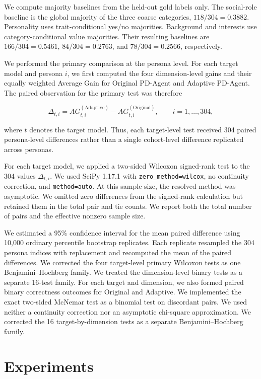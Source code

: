 \documentclass{ieeeaccess}
\begin{document}
We compute majority baselines from the held-out gold labels only. The social-role baseline
is the global majority of the three coarse categories, $118/304=0.3882$. Personality uses
trait-conditional yes/no majorities. Background and interests use category-conditional
value majorities. Their resulting baselines are $166/304=0.5461$, $84/304=0.2763$, and
$78/304=0.2566$, respectively.

We performed the primary comparison at the persona level. For each target model and persona $i$, we first computed the four dimension-level gains and their equally weighted Average Gain for Original PD-Agent and Adaptive PD-Agent. The paired observation for the primary test was therefore

\begin{equation}
\Delta_{t,i}
=
AG_{t,i}^{(\mathrm{Adaptive})}
-
AG_{t,i}^{(\mathrm{Original})},
\qquad i=1,\ldots,304,
\end{equation}

where $t$ denotes the target model. Thus, each target-level test received 304 paired persona-level differences rather than a single cohort-level difference replicated across personas.

For each target model, we applied a two-sided Wilcoxon signed-rank test to the 304 values
$\Delta_{t,i}$. We used SciPy 1.17.1 with \texttt{zero\_method=wilcox}, no continuity
correction, and \texttt{method=auto}. At this sample size, the resolved method was
asymptotic. We omitted zero differences from the signed-rank calculation but retained
them in the total pair and tie counts. We report both the total number of pairs and the
effective nonzero sample size.

We estimated a 95\% confidence interval for the mean paired difference using 10,000 ordinary percentile bootstrap replicates. Each replicate resampled the 304 persona indices with replacement and recomputed the mean of the paired differences. We corrected the four target-level primary Wilcoxon tests as one Benjamini--Hochberg
family. We treated the dimension-level binary tests as a separate 16-test family.
For each target and dimension, we also formed paired binary correctness outcomes for Original and Adaptive. We implemented the exact two-sided McNemar test as a binomial test on discordant pairs.
We used neither a continuity correction nor an asymptotic chi-square approximation.
We corrected the 16 target-by-dimension tests as a separate Benjamini--Hochberg family.

\section{Experiments}
\label{sec:experiments}
\end{document}
